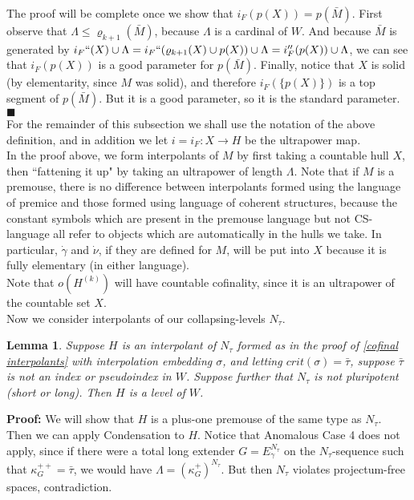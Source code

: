 \documentclass[12pt]{article}
\newtheorem{lem}[thm]{Lemma}
\begin{document}
 The proof will be complete once we show that $i_F (p(X)) = p(\bar{M})$.  First observe that $\Lambda \leq \varrho_{k+1} (\bar{M})$, because $\Lambda$ is a cardinal of $W$.  And because $\bar{M}$ is generated by $i_F`` (X) \cup \Lambda = i_F`` (\varrho_{k+1} (X) \cup p(X)) \cup \Lambda = i_F''(p(X)) \cup \Lambda$, we can see that $i_F (p(X))$ is a good parameter for $p(\bar{M})$.  Finally, notice that $X$ is solid (by elementarity, since $M$ was solid), and therefore $i_F ( \{ p(X) \})$ is a top segment of $p (\bar{M})$.  But it is a good parameter, so it is the standard parameter. $\blacksquare$\\


For the remainder of this subsection we shall use the notation of the above definition, and in addition we let $i = i_F : X \longrightarrow H$ be the ultrapower map.\\


In the proof above, we form interpolants of $M$ by first taking a countable hull $X$, then ``fattening it up" by taking an ultrapower of length $\Lambda$.  Note that if $M$ is a premouse, there is no difference between interpolants formed using the language of premice and those formed using language of coherent structures, because the constant symbols which are present in the premouse language but not CS-language all refer to objects which are automatically in the hulls we take.  In particular, $\dot{\gamma}$ and $\dot{\nu}$, if they are defined for $M$, will be put into $X$ because it is fully elementary (in either language).\\

Note that $o(H^{(k)})$ will have countable cofinality, since it is an ultrapower of the countable set $X$.\\

Now we consider interpolants of our collapsing-levels $N_\tau$.\\


\begin{lem} \label{non-pluripotent interpolants condense to W-levels}
Suppose $H$ is an interpolant of $N_\tau$ formed as in the proof of \ref{cofinal interpolants} with interpolation embedding $\sigma$, and letting $crit(\sigma) = \bar{\tau}$, suppose $\bar{\tau}$ is not an index or pseudoindex in $W$.  Suppose further that $N_\tau$ is not pluripotent (short or long).  Then $H$ is a level of $W$.
\end{lem}

\textbf{Proof:} We will show that $H$ is a plus-one premouse of the same type as $N_\tau$.  Then we can apply Condensation to $H$.  Notice that Anomalous Case 4 does not apply, since if there were a total long extender $G = E_\gamma^{N_\tau}$ on the $N_\tau$-sequence such that $\kappa_G^{++} = \bar{\tau}$, we would have $\Lambda = (\kappa_G^+)^{N_\tau}$.  But then $N_\tau$ violates projectum-free spaces, contradiction.\\
\end{document}
